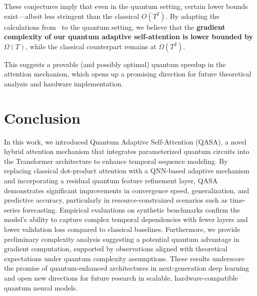 \documentclass[conference]{IEEEtran}
\begin{document}
These conjectures imply that even in the quantum setting, certain lower bounds exist—albeit less stringent than the classical \( O(T^2) \). By adapting the calculations from~\cite{alman2024fine} to the quantum setting, we believe that the \textbf{gradient complexity of our quantum adaptive self-attention is lower bounded by \( \Omega(T) \)}, while the classical counterpart remains at \( \Omega(T^2) \).

This suggests a provable (and possibly optimal) quantum speedup in the attention mechanism, which opens up a promising direction for future theoretical analysis and hardware implementation.


\section{Conclusion}
In this work, we introduced Quantum Adaptive Self-Attention (QASA), a novel hybrid attention mechanism that integrates parameterized quantum circuits into the Transformer architecture to enhance temporal sequence modeling. By replacing classical dot-product attention with a QNN-based adaptive mechanism and incorporating a residual quantum feature refinement layer, QASA demonstrates significant improvements in convergence speed, generalization, and predictive accuracy, particularly in resource-constrained scenarios such as time-series forecasting. Empirical evaluations on synthetic benchmarks confirm the model’s ability to capture complex temporal dependencies with fewer layers and lower validation loss compared to classical baselines. Furthermore, we provide preliminary complexity analysis suggesting a potential quantum advantage in gradient computation, supported by observations aligned with theoretical expectations under quantum complexity assumptions. These results underscore the promise of quantum-enhanced architectures in next-generation deep learning and open new directions for future research in scalable, hardware-compatible quantum neural models.



\end{document}
